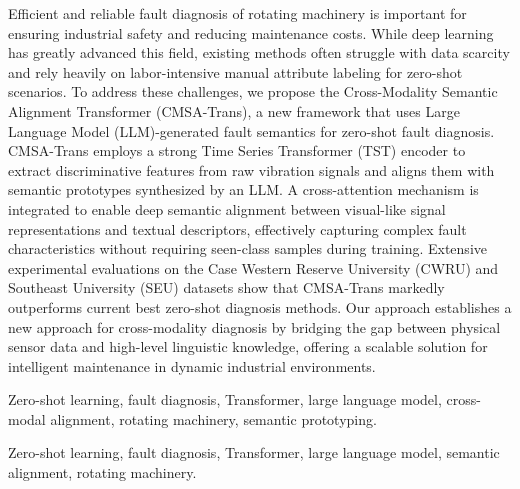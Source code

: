 Efficient and reliable fault diagnosis of rotating machinery is important for ensuring industrial safety and reducing maintenance costs. While deep learning has greatly advanced this field, existing methods often struggle with data scarcity and rely heavily on labor-intensive manual attribute labeling for zero-shot scenarios. To address these challenges, we propose the Cross-Modality Semantic Alignment Transformer (CMSA-Trans), a new framework that uses Large Language Model (LLM)-generated fault semantics for zero-shot fault diagnosis. CMSA-Trans employs a strong Time Series Transformer (TST) encoder to extract discriminative features from raw vibration signals and aligns them with semantic prototypes synthesized by an LLM. A cross-attention mechanism is integrated to enable deep semantic alignment between visual-like signal representations and textual descriptors, effectively capturing complex fault characteristics without requiring seen-class samples during training. Extensive experimental evaluations on the Case Western Reserve University (CWRU) and Southeast University (SEU) datasets show that CMSA-Trans markedly outperforms current best zero-shot diagnosis methods. Our approach establishes a new approach for cross-modality diagnosis by bridging the gap between physical sensor data and high-level linguistic knowledge, offering a scalable solution for intelligent maintenance in dynamic industrial environments.

\begin{IEEEkeywords}
Zero-shot learning, fault diagnosis, Transformer, large language model, cross-modal alignment, rotating machinery, semantic prototyping.
\end{IEEEkeywords}

\begin{IEEEkeywords}
Zero-shot learning, fault diagnosis, Transformer, large language model, semantic alignment, rotating machinery.
\end{IEEEkeywords}
